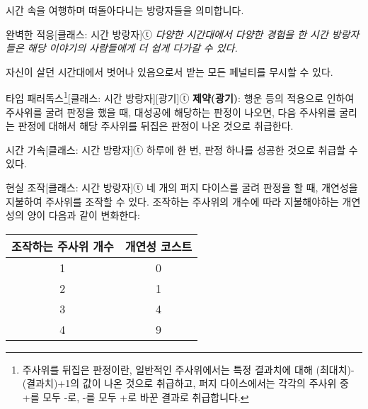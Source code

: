 \documentclass{report}
\begin{document}
	시간 속을 여행하며 떠돌아다니는 방랑자들을 의미합니다.
	
	\begin{story}{완벽한 적응}{[클래스: 시간 방랑자]ⓣ}
		\textit{다양한 시간대에서 다양한 경험을 한 시간 방랑자들은 해당 이야기의 사람들에게 더 쉽게 다가갈 수 있다.}
		
		자신이 살던 시간대에서 벗어나 있음으로서 받는 모든 페널티를 무시할 수 있다.
		
	\end{story}
	
	\begin{story}{타임 패러독스\footnote{주사위를 뒤집은 판정이란, 일반적인 주사위에서는 특정 결과치에 대해 (최대치)-(결과치)+1의 값이 나온 것으로 취급하고, 퍼지 다이스에서는 각각의 주사위 중 +를 모두 -로, -를 모두 +로 바꾼 결과로 취급합니다.}}{[클래스: 시간 방랑자][광기]ⓣ}
		\textbf{제약(광기)}: 행운 등의 적용으로 인하여 주사위를 굴려 판정을 했을 때, 대성공에 해당하는 판정이 나오면, 다음 주사위를 굴리는 판정에 대해서 해당 주사위를 뒤집은 판정이 나온 것으로 취급한다.
		
	\end{story}
	
	\begin{story}{시간 가속}{[클래스: 시간 방랑자]ⓣ}
		하루에 한 번, 판정 하나를 성공한 것으로 취급할 수 있다.
		
	\end{story}
	
	\begin{story}{현실 조작}{[클래스: 시간 방랑자]ⓣ}
		네 개의 퍼지 다이스를 굴려 판정을 할 때, 개연성을 지불하여 주사위를 조작할 수 있다. 조작하는 주사위의 개수에 따라 지불해야하는 개연성의 양이 다음과 같이 변화한다:
		\begin{center}
			\begin{tabular}{c|c}
				\textbf{조작하는 주사위 개수} & \textbf{개연성 코스트} \\\hline\hline
				1                             & 0                      \\\hline
				2                             & 1                      \\\hline
				3                             & 4                      \\\hline
				4                             & 9                      \\\hline
				
			\end{tabular}
		\end{center}
		
	\end{story}
\end{document}

